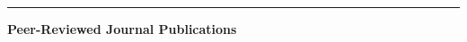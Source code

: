\documentclass[10pt]{letter}
\begin{document}
\par\noindent\rule{\textwidth}{0.5pt}



\begin{center}
\textbf{\large Peer-Reviewed Journal Publications} \\
\end{center}
\vspace{-5pt}
\begin{justify}
\begin{enumerate}[leftmargin=*]


        
        
    

\end{enumerate}
\end{justify}
\end{document}
